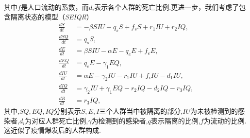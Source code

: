 \documentclass[UTF8]{ctexart}
\begin{document}
				其中$f$是人口流动的系数，而$d_i$表示各个人群的死亡比例.更进一步，我们考虑了包含隔离状态的模型（\emph{SEIQR}）
				\begin{equation}\label{SEIQR}
				\begin{split}
				\frac{dS}{dt} &=-\beta SIU - q_{s}S+f_{s}S+r_1IU+r_2IQ ,\\ 
				\frac{dSQ}{dt} &= q_{s}S, \\
				\frac{dE}{dt} &= \beta SIU - \alpha E - q_{e}E+f_{e}E, \\
				\frac{dEQ}{dt} &= q_{e}E - \gamma_1EQ, \\
				\frac{dIU}{dt} &= \alpha E -\gamma_2IU -r_1 IU+f_{i}IU - d_1 IU, \\
				\frac{dIQ}{dt} &= \gamma_2IU + \gamma_1EQ - r_2 IQ - d_2 IQ - r_3 IQ,\\
				\frac{dR}{dt} & =r_3 IQ,
				\end{split}
				\end{equation}
				其中,$SQ,EQ,IQ$分别表示$S,E,I$三个人群当中被隔离的部分,$IU$为未被检测到的感染者,$d_i$为对应人群死亡比例,$\gamma$为检测到的感染者,$q$表示隔离的比例,$f$为流动的比例.这近似了疫情爆发后的人群构成.
\end{document}
